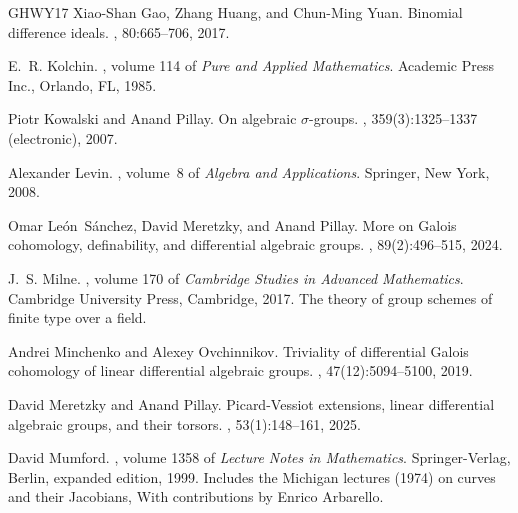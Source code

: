 \documentclass[oneside,reqno]{amsart}
\theoremstyle{definition}
\begin{document}
\begin{thebibliography}{GHWY17}
Xiao-Shan Gao, Zhang Huang, and Chun-Ming Yuan.
\newblock Binomial difference ideals.
, 80:665--706, 2017.

E.~R. Kolchin.
, volume 114 of {\em Pure and
  Applied Mathematics}.
\newblock Academic Press Inc., Orlando, FL, 1985.

Piotr Kowalski and Anand Pillay.
\newblock On algebraic {$\sigma$}-groups.
, 359(3):1325--1337 (electronic), 2007.

Alexander Levin.
, volume~8 of {\em Algebra and Applications}.
\newblock Springer, New York, 2008.

Omar Le\'on~S\'anchez, David Meretzky, and Anand Pillay.
\newblock More on {G}alois cohomology, definability, and differential algebraic
  groups.
, 89(2):496--515, 2024.

J.~S. Milne.
, volume 170 of {\em Cambridge Studies in
  Advanced Mathematics}.
\newblock Cambridge University Press, Cambridge, 2017.
\newblock The theory of group schemes of finite type over a field.

Andrei Minchenko and Alexey Ovchinnikov.
\newblock Triviality of differential {G}alois cohomology of linear differential
  algebraic groups.
, 47(12):5094--5100, 2019.

David Meretzky and Anand Pillay.
\newblock Picard-{V}essiot extensions, linear differential algebraic groups,
  and their torsors.
, 53(1):148--161, 2025.

David Mumford.
, volume 1358 of {\em
  Lecture Notes in Mathematics}.
\newblock Springer-Verlag, Berlin, expanded edition, 1999.
\newblock Includes the Michigan lectures (1974) on curves and their Jacobians,
  With contributions by Enrico Arbarello.


\end{thebibliography}
\end{document}
